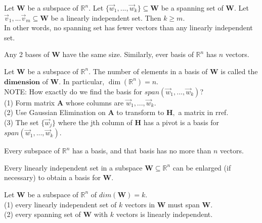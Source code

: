 \documentclass{article}
\begin{document}
\begin{theorem}
Let $\boldsymbol{W}$ be a subspace of $\mathbb{R}^n.$ Let $\{\vec{w}_{1}, ..., \vec{w}_{k}\} \subseteq \boldsymbol{W}$ be a spanning set of $\boldsymbol{W}.$ Let ${\vec{v}_{1}, ... \vec{v}_{m}} \subseteq \boldsymbol{W}$ be a linearly independent set. Then $k \geq m.$ \\

In other words, no spanning set has fewer vectors than any linearly independent set.
\end{theorem}

\begin{corollary}
Any 2 bases of $\boldsymbol{W}$ have the same size. Similarly, ever basis of $\mathbb{R}^n$ has $n$ vectors.
\end{corollary}

\begin{definition}
Let $\boldsymbol{W}$ be a subspace of $\mathbb{R}^n.$ The number of elements in a  basis of $\boldsymbol{W}$ is called the $\textbf{dimension}$ of $\boldsymbol{W}.$ In particular, $\dim(\mathbb{R}^n) = n.$ \\

NOTE: How exactly do we find the basis for $span(\vec{w}_{1}, ..., \vec{w}_{k})$? \\
(1) Form matrix $\boldsymbol{A}$ whose columns are $\vec{w}_{1}, ..., \vec{w}_{k}.$ \\
(2) Use Gaussian Elimination on $\boldsymbol{A}$ to transform to $\boldsymbol{H},$ a matrix in rref. \\
(3) The set $\{\vec{w}_{j}\}$ where the jth column of $\boldsymbol{H}$ has a pivot is a basis for $span(\vec{w}_{1}, ..., \vec{w}_{k})$.
\end{definition}

\begin{theorem}
Every subspace of $\mathbb{R}^n$ has a basis, and that basis has no more than $n$ vectors.
\end{theorem}

\begin{theorem}
Every linearly independent set in a subspace $\boldsymbol{W} \subseteq \mathbb{R}^n$ can be enlarged (if necessary) to obtain a basis for $\boldsymbol{W}.$
\end{theorem}

\begin{theorem}
Let $\boldsymbol{W}$ be a subspace of $\mathbb{R}^n$ of $dim(\boldsymbol{W}) = k.$ \\
(1) every linearly independent set of $k$ vectors in $\boldsymbol{W}$ must span $\boldsymbol{W}.$ \\
(2) every spanning set of $\boldsymbol{W}$ with $k$ vectors is linearly independent.
\end{theorem}
\end{document}
